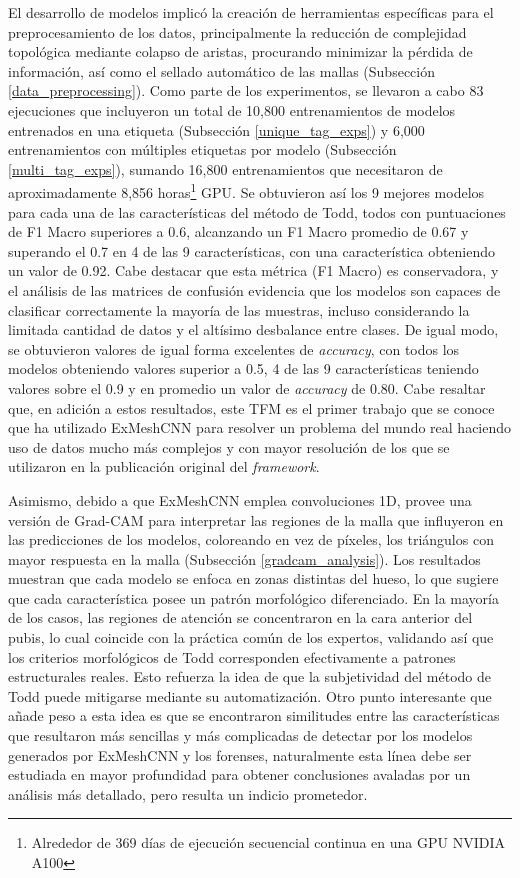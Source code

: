 El desarrollo de modelos implicó la creación de herramientas específicas para el preprocesamiento de los datos, principalmente la reducción de complejidad topológica mediante colapso de aristas, procurando minimizar la pérdida de información, así como el sellado automático de las mallas (Subsección \ref{data_preprocessing}). Como parte de los experimentos, se llevaron a cabo 83 ejecuciones que incluyeron un total de 10,800 entrenamientos de modelos entrenados en una etiqueta (Subsección \ref{unique_tag_exps}) y 6,000 entrenamientos con múltiples etiquetas por modelo (Subsección \ref{multi_tag_exps}), sumando 16,800 entrenamientos que necesitaron de aproximadamente 8,856 horas\footnote{Alrededor de 369 días de ejecución secuencial continua en una GPU NVIDIA A100} GPU\cite{englewood_understanding_2025}. Se obtuvieron así los 9 mejores modelos para cada una de las características del método de Todd, todos con puntuaciones de F1 Macro superiores a 0.6, alcanzando un F1 Macro promedio de 0.67 y superando el 0.7 en 4 de las 9 características, con una característica obteniendo un valor de 0.92. Cabe destacar que esta métrica (F1 Macro) es conservadora, y el análisis de las matrices de confusión evidencia que los modelos son capaces de clasificar correctamente la mayoría de las muestras, incluso considerando la limitada cantidad de datos y el altísimo desbalance entre clases. De igual modo, se obtuvieron valores de igual forma excelentes de \textit{accuracy}, con todos los modelos obteniendo valores superior a 0.5, 4 de las 9 características teniendo valores sobre el 0.9 y en promedio un valor de \textit{accuracy} de 0.80. Cabe resaltar que, en adición a estos resultados, este TFM es el primer trabajo que se conoce que ha utilizado ExMeshCNN para resolver un problema del mundo real haciendo uso de datos mucho más complejos y con mayor resolución de los que se utilizaron en la publicación original del \textit{framework}.

Asimismo, debido a que ExMeshCNN emplea convoluciones 1D, provee una versión de Grad-CAM para interpretar las regiones de la malla que influyeron en las predicciones de los modelos, coloreando en vez de píxeles, los triángulos con mayor respuesta en la malla (Subsección \ref{gradcam_analysis}). Los resultados muestran que cada modelo se enfoca en zonas distintas del hueso, lo que sugiere que cada característica posee un patrón morfológico diferenciado. En la mayoría de los casos, las regiones de atención se concentraron en la cara anterior del pubis, lo cual coincide con la práctica común de los expertos, validando así que los criterios morfológicos de Todd corresponden efectivamente a patrones estructurales reales. Esto refuerza la idea de que la subjetividad del método de Todd puede mitigarse mediante su automatización. Otro punto interesante que añade peso a esta idea es que se encontraron similitudes entre las características que resultaron más sencillas y más complicadas de detectar por los modelos generados por ExMeshCNN y los forenses, naturalmente esta línea debe ser estudiada en mayor profundidad para obtener conclusiones avaladas por un análisis más detallado, pero resulta un indicio prometedor.

